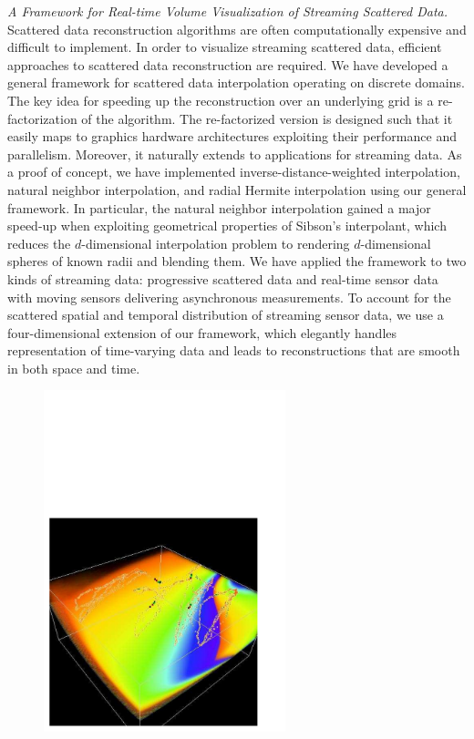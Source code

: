 {\em A Framework for Real-time Volume Visualization of Streaming Scattered
Data.} Scattered data reconstruction algorithms are often computationally
expensive and difficult to implement.  In order to visualize streaming
scattered data, efficient approaches to scattered data reconstruction are
required.  We have developed a general framework for scattered data
interpolation operating on discrete domains.  The key idea for speeding up the
reconstruction over an underlying grid is a re-factorization of the algorithm. 
The re-factorized version is designed such that it easily maps to graphics
hardware architectures  exploiting their performance and parallelism. Moreover,
it naturally extends to applications for streaming data.  As a proof of
concept, we have implemented inverse-distance-weighted interpolation, natural
neighbor interpolation,  and radial Hermite interpolation using our general
framework. In particular, the natural neighbor interpolation  gained a major
speed-up when exploiting geometrical properties of Sibson's interpolant, which
reduces the $d$-dimensional interpolation problem to rendering $d$-dimensional
spheres of known radii and blending them. We have applied the framework to two
kinds of streaming data: progressive scattered data and real-time sensor data
with moving sensors delivering asynchronous measurements.  To account for the
scattered spatial and temporal distribution of streaming sensor data,  we use a
four-dimensional extension of our framework, which elegantly handles
representation of  time-varying data and leads to reconstructions that are
smooth in both space and time.


\begin{figure}[ht]
  \begin{center}
    \includegraphics[width=7cm]{MathTheoPhys/Linsen/Linsen_2006_Fig3.pdf}
   \end{center}
\end{figure}

%

